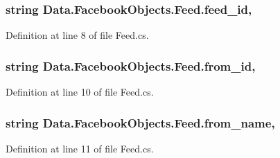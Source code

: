 \subsubsection[{\texorpdfstring{feed\+\_\+id}{feed_id}}]{\setlength{\rightskip}{0pt plus 5cm}string Data.\+Facebook\+Objects.\+Feed.\+feed\+\_\+id\hspace{0.3cm}{\ttfamily [get]}, {\ttfamily [set]}}\hypertarget{class_data_1_1_facebook_objects_1_1_feed_acfbbdb5bc789acd45a166c3efc8bcf48}{}\label{class_data_1_1_facebook_objects_1_1_feed_acfbbdb5bc789acd45a166c3efc8bcf48}


Definition at line 8 of file Feed.\+cs.

\subsubsection[{\texorpdfstring{from\+\_\+id}{from_id}}]{\setlength{\rightskip}{0pt plus 5cm}string Data.\+Facebook\+Objects.\+Feed.\+from\+\_\+id\hspace{0.3cm}{\ttfamily [get]}, {\ttfamily [set]}}\hypertarget{class_data_1_1_facebook_objects_1_1_feed_afff967ca34c531fc92fd09f359b375c5}{}\label{class_data_1_1_facebook_objects_1_1_feed_afff967ca34c531fc92fd09f359b375c5}


Definition at line 10 of file Feed.\+cs.

\subsubsection[{\texorpdfstring{from\+\_\+name}{from_name}}]{\setlength{\rightskip}{0pt plus 5cm}string Data.\+Facebook\+Objects.\+Feed.\+from\+\_\+name\hspace{0.3cm}{\ttfamily [get]}, {\ttfamily [set]}}\hypertarget{class_data_1_1_facebook_objects_1_1_feed_aa50149343a8931ea03ec99fd81f8100c}{}\label{class_data_1_1_facebook_objects_1_1_feed_aa50149343a8931ea03ec99fd81f8100c}


Definition at line 11 of file Feed.\+cs.

